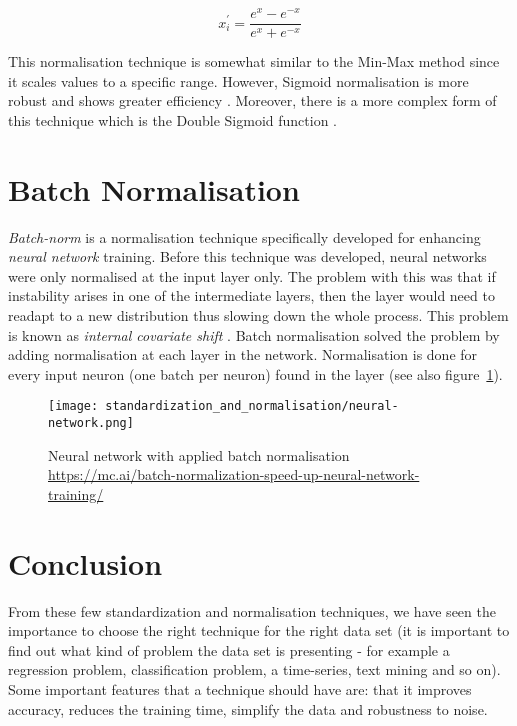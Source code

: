 \begin{equation}
\label{eq:sn_tan-sig}
x^{\prime}_{i} = \frac{e^{x} - e^{-x}}{e^{x} + e^{-x}}
\end{equation}

This normalisation technique is somewhat similar to the Min-Max method since it scales values to a specific range.  However, Sigmoid normalisation is more robust and shows greater efficiency \citep{jain2005score}.  Moreover, there is a more complex form of this technique which is the Double Sigmoid function \citep{cappelli2000combining}.

\section{Batch Normalisation}
\emph{Batch-norm} is a normalisation technique specifically developed for enhancing \emph{neural network} training.  Before this technique was developed, neural networks were only normalised at the input layer only.  The problem with this was that if instability arises in one of the intermediate layers, then the layer would need to readapt to a new distribution thus slowing down the whole process.  This problem is known as \emph{internal covariate shift} \citep{ioffe2015batch}.  Batch normalisation solved the problem by adding normalisation at each layer in the network.  Normalisation is done for every input neuron (one batch per neuron) found in the layer (see also figure~\ref{fig:sn_neural}).

\begin{figure}
	\texttt{[image: standardization\_and\_normalisation/neural-network.png]}
	\caption{Neural network with applied batch normalisation \url{https://mc.ai/batch-normalization-speed-up-neural-network-training/}}
	\label{fig:sn_neural}
\end{figure} 

\section{Conclusion}
From these few standardization and normalisation techniques, we have seen the importance to choose the right technique for the right data set (it is important to find out what kind of problem the data set is presenting - for example a regression problem, classification problem, a time-series, text mining and so on).  Some important features that a technique should have are: that it improves accuracy, reduces the training time, simplify the data and robustness to noise.

